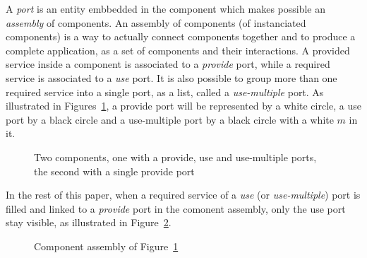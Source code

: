 A \emph{port} is an entity embbedded in the component which makes possible an \emph{assembly} of components. An assembly of components (of instanciated components) is a way to actually connect components together and to produce a complete application, as a set of components and their interactions. A provided service inside a component is associated to a \emph{provide} port, while a required service is associated to a \emph{use} port. It is also possible to group more than one required service into a single port, as a list, called a \emph{use-multiple} port. As illustrated in Figures~\ref{fig:ports}, a provide port will be represented by a white circle, a use port by a black circle and a use-multiple port by a black circle with a white $m$ in it.

\begin{figure}[h!]
\begin{center}
\caption{Two components, one with a provide, use and use-multiple ports, the second with a single provide port}
\label{fig:ports}
\end{center}
\end{figure}

In the rest of this paper, when a required service of a \emph{use} (or \emph{use-multiple}) port is filled and linked to a \emph{provide} port in the comonent assembly, only the use port stay visible, as illustrated in Figure~\ref{fig:assembly}.

\begin{figure}[h!]
\begin{center}
\caption{Component assembly of Figure~\ref{fig:ports}}
\label{fig:assembly}
\end{center}
\end{figure}

